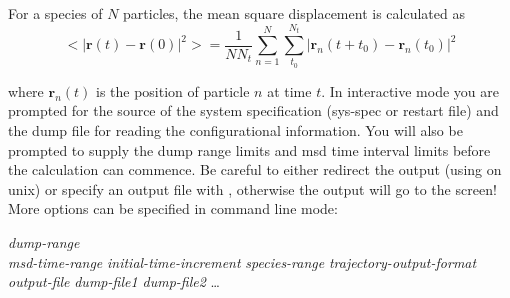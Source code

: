 \documentclass[a4paper,twoside]{report}
\providecommand{\bm}[1]{\mathbf{#1}}
\begin{document}
For a species of $N$ particles, the mean square displacement is
calculated as
\begin{equation}  
        <|\bm{r}(t)-\bm{r}(0)|^2> = \frac{1}{N N_t}
        \sum_{n=1}^{N} \sum_{t_0}^{N_t}
        |\bm{r}_n(t+t_0) - \bm{r}_n(t_0)|^2
\end{equation}

where $\bm{r}_n(t)$ is the position of particle $n$ at
time $t$.  In interactive mode you are prompted for the source of the
system specification (sys-spec or restart file) and the dump file for
reading the configurational information. You will also be prompted to
supply the dump range limits and msd time interval limits before the
calculation can commence. Be careful to either redirect the output
(using \Lit{>} on unix) or specify an output file with ,
otherwise the output will go to the screen!  More options can be
specified in command line mode:

\begin{center}
\Lit{[-t} \textit{dump-range}\Lit{]} \\
\Lit{[-m} \textit{msd-time-range}\Lit{]}
\Lit{[-i} \textit{initial-time-increment}\Lit{]}
\Lit{[-g} \textit{species-range}\Lit{]}
\Lit{[-w} \textit{trajectory-output-format}\Lit{]} \\
\Lit{[-x|-X]} \Lit{[-y|-Y]} \Lit{[-z|-Z]}
\Lit{[-v]} 
\Lit{[-o} \textit{output-file} \Lit{]}
\textit{dump-file1 dump-file2} \ldots
\end{center}
\end{document}
